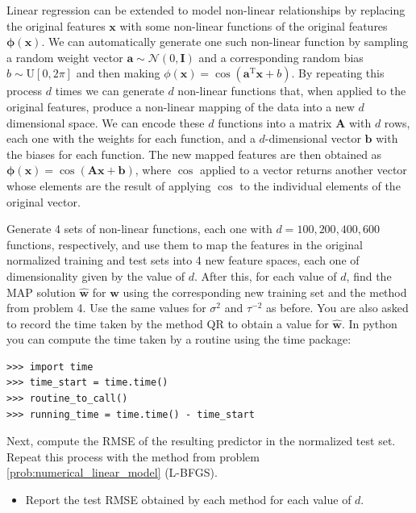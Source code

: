 \documentclass[submit]{harvardml}
\newcommand{\N}{\mathcal{N}}
\begin{document}
\begin{problem}[14pts]\label{prob:non_linear_model}
Linear regression can be extended to model non-linear relationships by
replacing the original features $\mathbf{x}$ with some non-linear functions of
the original features $\bm \phi(\mathbf{x})$. We can automatically generate one
such non-linear function by sampling a random weight vector $\mathbf{a}
\sim \N(0,\mathbf{I})$ and a corresponding random bias $b \sim
\text{U}[0, 2\pi]$ and then making $\phi(\mathbf{x}) = \cos(\mathbf{a}^\text{T}
\mathbf{x} + b)$.  By repeating this process $d$ times we can generate $d$
non-linear functions that, when applied to the original features, produce a
non-linear mapping of the data into a new $d$ dimensional space.
We can encode these $d$ functions into a matrix $\mathbf{A}$ with $d$ rows, each one
with the weights for each function, and a $d$-dimensional vector $\mathbf{b}$
with the biases for each function. The new mapped features are then obtained as
$\bm \phi (\mathbf{x}) = \cos(\mathbf{A} \mathbf{x} + \mathbf{b})$, where
$\cos$ applied to a vector returns another vector whose elements are the result
of applying $\cos$ to the individual elements of the original vector.


Generate 4 sets of non-linear functions, each one with $d=100, 200, 400, 600$ functions, respectively, and use
them to map the features in the original normalized training and test sets into
4 new feature spaces, each one of dimensionality given by the value of $d$. After this, for each
value of $d$, find the MAP solution $\hat{\mathbf{w}}$ for $\mathbf{w}$ using the
corresponding new training set and the method from problem
4. Use the same values for $\sigma^2$ and $\tau^{-2}$ as before.
You are also asked to
record the time taken by the method QR to obtain a value for $\hat{\mathbf{w}}$.
In python  you can compute the time taken by a routine using the time package:
\begin{verbatim}
>>> import time
>>> time_start = time.time()
>>> routine_to_call()
>>> running_time = time.time() - time_start
\end{verbatim}
Next, compute the RMSE of the resulting predictor in the normalized test
set. Repeat this process with the method from problem
\ref{prob:numerical_linear_model} (L-BFGS).

\begin{itemize}
\item Report the test RMSE obtained by each method for each value of $d$.
\end{itemize}


\end{problem}
\end{document}

